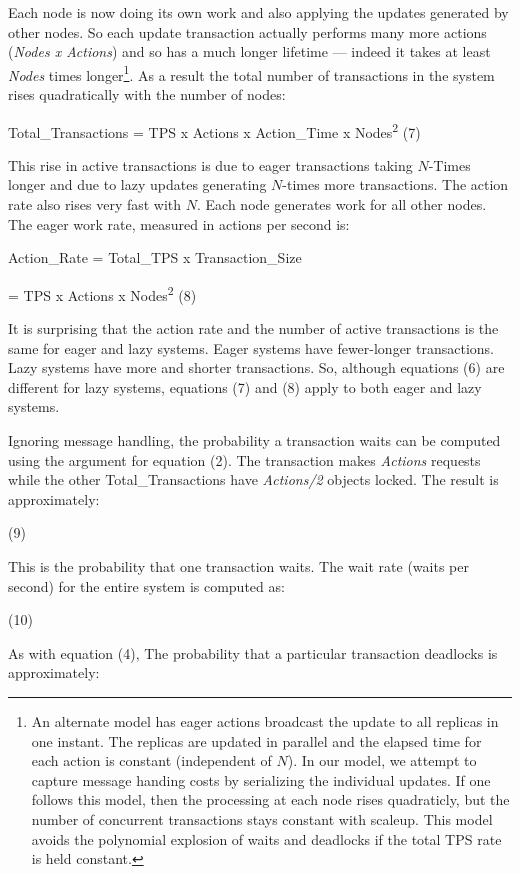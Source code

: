 \documentclass[a4paper,12pt,twoside,openright]{article}
\begin{document}
Each node is now doing its own work and also applying the updates
generated by other nodes. So each update transaction actually performs
many more actions (\emph{Nodes x Actions}) and so has a much longer
lifetime --- indeed it takes at least \emph{Nodes} times
longer\footnote{An alternate model has eager actions broadcast the
  update to all replicas in one instant. The replicas are updated in
  parallel and the elapsed time for each action is constant (independent
  of \(N\)). In our model, we attempt to capture message handing
  costs by serializing the individual updates. If one follows this
  model, then the processing at each node rises quadraticly, but the
  number of concurrent transactions stays constant with scaleup. This
  model avoids the polynomial explosion of waits and deadlocks if the
  total TPS rate is held constant.}. As a result the total number of
transactions in the system rises quadratically with the number of nodes:

Total\_Transactions = TPS x Actions x Action\_Time x
Nodes\textsuperscript{2} (7)

This rise in active transactions is due to eager transactions taking
\(N\)-Times longer and due to lazy updates generating \(N\)-times
more transactions. The action rate also rises very fast with \(N\).
Each node generates work for all other nodes. The eager work rate,
measured in actions per second is:

Action\_Rate = Total\_TPS x Transaction\_Size

= TPS x Actions x Nodes\textsuperscript{2} (8)

It is surprising that the action rate and the number of active
transactions is the same for eager and lazy systems. Eager systems have
fewer-longer transactions. Lazy systems have more and shorter
transactions. So, although equations (6) are different for lazy systems,
equations (7) and (8) apply to both eager and lazy systems.

Ignoring message handling, the probability a transaction waits can be
computed using the argument for equation (2). The transaction makes
\emph{Actions} requests while the other Total\_Transactions have
\emph{Actions/2} objects locked. The result is approximately:

(9)

This is the probability that one transaction waits. The wait rate (waits
per second) for the entire system is computed as:

(10)

As with equation (4), The probability that a particular transaction
deadlocks is approximately:
\end{document}
